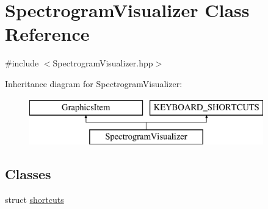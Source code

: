 \hypertarget{structSpectrogramVisualizer}{}\section{Spectrogram\+Visualizer Class Reference}
\label{structSpectrogramVisualizer}


{\ttfamily \#include $<$Spectrogram\+Visualizer.\+hpp$>$}

Inheritance diagram for Spectrogram\+Visualizer\+:\begin{figure}[H]
\begin{center}
\leavevmode
\includegraphics[height=2.000000cm]{structSpectrogramVisualizer}
\end{center}
\end{figure}
\subsection*{Classes}
\begin{DoxyCompactItemize}
\item 
struct \mbox{\hyperlink{structSpectrogramVisualizer_1_1shortcuts}{shortcuts}}
\end{DoxyCompactItemize}
